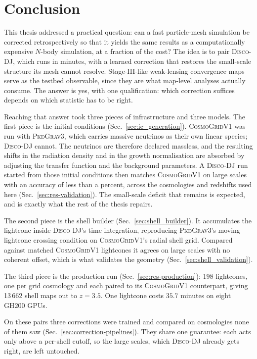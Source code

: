 \documentclass{report}
\begin{document}
\chapter{Conclusion}
\label{ch:conclusion}

This thesis addressed a practical question: can a fast particle-mesh simulation be corrected retrospectively so that it yields the same results as a computationally expensive \mbox{$N$}-body simulation, at a fraction of the cost? The idea is to pair \textsc{Disco-DJ}, which runs in minutes, with a learned correction that restores the small-scale structure its mesh cannot resolve. Stage-III-like weak-lensing convergence maps serve as the testbed observable, since they are what map-level analyses actually consume. The answer is yes, with one qualification: which correction suffices depends on which statistic has to be right.

Reaching that answer took three pieces of infrastructure and three models. The first piece is the initial conditions (Sec.~\ref{sec:ic_generation}). \textsc{CosmoGridV1} was run with \textsc{PkdGrav3}, which carries massive neutrinos as their own linear species; \textsc{Disco-DJ} cannot. The neutrinos are therefore declared massless, and the resulting shifts in the radiation density and in the growth normalisation are absorbed by adjusting the transfer function and the background parameters. A \textsc{Disco-DJ} run started from those initial conditions then matches \textsc{CosmoGridV1} on large scales with an accuracy of less than a percent, across the cosmologies and redshifts used here (Sec.~\ref{sec:res-validation}). The small-scale deficit that remains is expected, and is exactly what the rest of the thesis repairs.

The second piece is the shell builder (Sec.~\ref{sec:shell_builder}). It accumulates the lightcone inside \textsc{Disco-DJ}'s time integration, reproducing \textsc{PkdGrav3}'s moving-lightcone crossing condition on \textsc{CosmoGridV1}'s radial shell grid. Compared against matched \textsc{CosmoGridV1} lightcones it agrees on large scales with no coherent offset, which is what validates the geometry (Sec.~\ref{sec:shell_validation}).

The third piece is the production run (Sec.~\ref{sec:res-production}): 198 lightcones, one per grid cosmology and each paired to its \textsc{CosmoGridV1} counterpart, giving 13\,662 shell maps out to \mbox{$z = 3.5$}. One lightcone costs \mbox{$35.7$} minutes on eight GH200 GPUs.

On these pairs three corrections were trained and compared on cosmologies none of them saw (Sec.~\ref{sec:correction-pipelines}). They share one guarantee: each acts only above a per-shell cutoff, so the large scales, which \textsc{Disco-DJ} already gets right, are left untouched.
\end{document}
